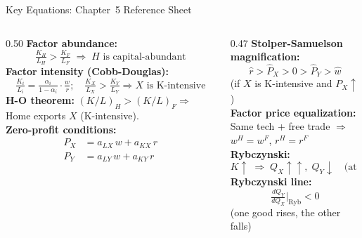 \documentclass[aspectratio=169]{beamer}
\begin{document}
\begin{frame}[shrink=8]{Key Equations: Chapter~5 Reference Sheet}
\begin{columns}[T]
\begin{column}{0.50\textwidth}
\textbf{Factor abundance:}
\[\tfrac{K_H}{L_H} > \tfrac{K_F}{L_F}
  \;\Rightarrow\; H\text{ is capital-abundant}\]
\textbf{Factor intensity (Cobb-Douglas):}
\[\tfrac{K_i}{L_i} = \tfrac{\alpha_i}{1-\alpha_i}
  \cdot\tfrac{w}{r}; \quad
  \tfrac{K_X}{L_X} > \tfrac{K_Y}{L_Y}
  \Rightarrow X\text{ is K-intensive}\]
\textbf{H-O theorem:}
$(K/L)_H > (K/L)_F \Rightarrow$
Home exports $X$ (K-intensive).\\[0.3em]
\textbf{Zero-profit conditions:}
\[\begin{aligned}
P_X &= a_{LX}\,w + a_{KX}\,r\\
P_Y &= a_{LY}\,w + a_{KY}\,r
\end{aligned}\]
\end{column}
\begin{column}{0.47\textwidth}
\textbf{Stolper-Samuelson magnification:}
\[\hat{r} > \hat{P}_X > 0 > \hat{P}_Y > \hat{w}\]
\small(if $X$ is K-intensive and $P_X\uparrow$)\\[0.3em]
\normalsize\textbf{Factor price equalization:}\\
\small Same tech + free trade $\Rightarrow$
$w^H = w^F$, $r^H = r^F$\\[0.3em]
\normalsize\textbf{Rybczynski:}
\[K\uparrow \;\Rightarrow\; Q_X\uparrow\uparrow,\;
  Q_Y\downarrow
  \quad\text{(at constant prices)}\]
\textbf{Rybczynski line:}
\[\tfrac{dQ_Y}{dQ_X}\bigg|_{\text{Ryb}} < 0\]
\small(one good rises, the other falls)
\end{column}
\end{columns}
\end{frame}
\end{document}
